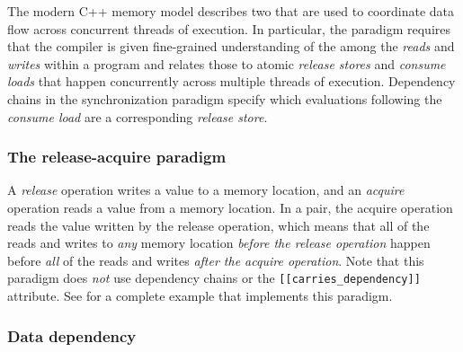 The modern C++ memory model describes two  that are used
to coordinate data flow across concurrent threads of execution. In
particular, the  paradigm requires that the
compiler is given fine-grained understanding of the  among the \emph{reads} and \emph{writes} within a program
and relates those to atomic \emph{release stores} and \emph{consume
loads} that happen concurrently across multiple threads of execution.
Dependency chains in the  synchronization
paradigm specify which evaluations following the \emph{consume load} are
 a corresponding \emph{release store}.

\subsubsection[The release-acquire paradigm]{The release-acquire paradigm}\label{the-release-acquire-paradigm}

A \emph{release} operation writes a value to a memory location, and an
\emph{acquire} operation reads a value from a memory location. In a  pair, the acquire operation reads the value written by
the release operation, which means that all of the reads and writes to
\emph{any} memory location \emph{before the release operation} happen
before \emph{all} of the reads and writes \emph{after the acquire operation}. Note that this paradigm does \emph{not} use 
dependency chains or the \lstinline![[carries_dependency]]! attribute. See  
for a
complete example that implements this paradigm.

\subsubsection[Data dependency]{Data dependency}\label{data-dependency}

